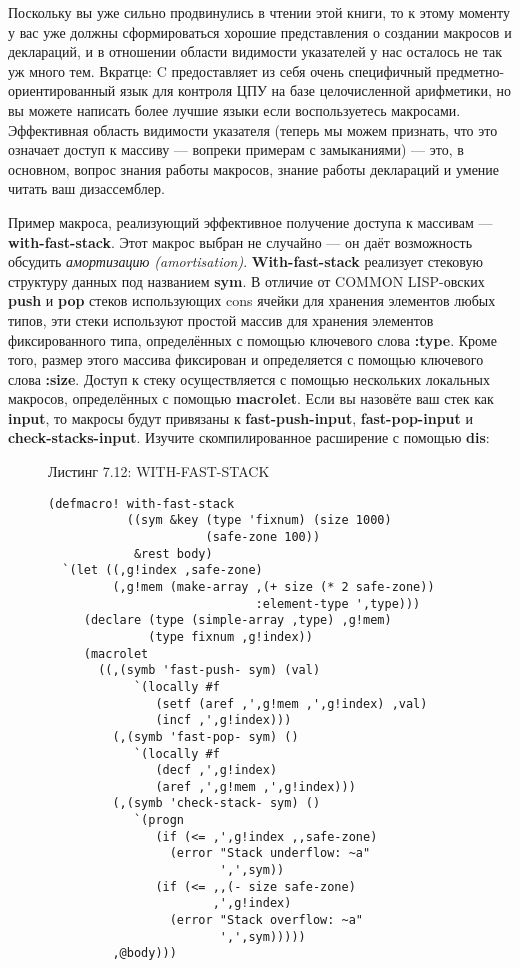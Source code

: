 Поскольку вы уже сильно продвинулись в чтении этой книги, то к этому моменту у вас уже должны сформироваться хорошие представления о создании макросов и деклараций, и в отношении области видимости указателей у нас осталось не так уж много тем. Вкратце: C предоставляет из себя очень специфичный предметно-ориентированный язык для контроля ЦПУ на базе целочисленной арифметики, но вы можете написать более лучшие языки если воспользуетесь макросами. Эффективная область видимости указателя (теперь мы можем признать, что это означает доступ к массиву --- вопреки примерам с замыканиями) --- это, в основном, вопрос знания работы макросов, знание работы деклараций и умение читать ваш дизассемблер.

Пример макроса, реализующий эффективное получение доступа к массивам --- \textbf{with-fast-stack}. Этот макрос выбран не случайно --- он даёт возможность обсудить \emph{амортизацию (amortisation)}. \textbf{With-fast-stack} реализует стековую структуру данных под названием \textbf{sym}. В отличие от COMMON LISP-овских \textbf{push} и \textbf{pop} стеков использующих cons ячейки для хранения элементов любых типов, эти стеки используют простой массив для хранения элементов фиксированного типа, определённых с помощью ключевого слова \textbf{:type}. Кроме того, размер этого массива фиксирован и определяется с помощью ключевого слова \textbf{:size}. Доступ к стеку осуществляется с помощью нескольких локальных макросов, определённых с помощью \textbf{macrolet}. Если вы назовёте ваш стек как \textbf{input}, то макросы будут привязаны к \textbf{fast-push-input}, \textbf{fast-pop-input} и \textbf{check-stacks-input}. Изучите скомпилированное расширение с помощью \textbf{dis}:

\begin{figure}Листинг 7.12: WITH-FAST-STACK\label{listing_7.12}
\listbegin
\begin{verbatim}
(defmacro! with-fast-stack
           ((sym &key (type 'fixnum) (size 1000)
                      (safe-zone 100))
            &rest body)
  `(let ((,g!index ,safe-zone)
         (,g!mem (make-array ,(+ size (* 2 safe-zone))
                             :element-type ',type)))
     (declare (type (simple-array ,type) ,g!mem)
              (type fixnum ,g!index))
     (macrolet
       ((,(symb 'fast-push- sym) (val)
            `(locally #f
               (setf (aref ,',g!mem ,',g!index) ,val)
               (incf ,',g!index)))
         (,(symb 'fast-pop- sym) ()
            `(locally #f
               (decf ,',g!index)
               (aref ,',g!mem ,',g!index)))
         (,(symb 'check-stack- sym) ()
            `(progn
               (if (<= ,',g!index ,,safe-zone)
                 (error "Stack underflow: ~a"
                        ',',sym))
               (if (<= ,,(- size safe-zone)
                       ,',g!index)
                 (error "Stack overflow: ~a"
                        ',',sym)))))
         ,@body)))
\end{verbatim}
\listend
\end{figure}

